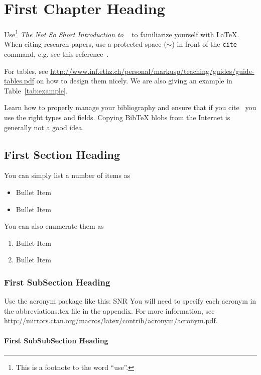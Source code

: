 \chapter{First Chapter Heading}

Use\footnote{This is a footnote to the word ``use''.}
\emph{The Not So Short Introduction to \LaTeXe}~\cite{Oetiker00}
to familiarize yourself with \LaTeX. When citing research papers, use a protected space ($\sim$) in front of the \texttt{cite} command, e.g. see this reference~\cite{inproceedings}.

For tables, see \url{http://www.inf.ethz.ch/personal/markusp/teaching/guides/guide-tables.pdf} on how to design them nicely. We are also giving an example in Table~\ref{tab:example}.

Learn how to properly manage your bibliography and ensure that if you cite~\cite{Achtzehn2015,ETSI2015,FCC,Fraga-Lamas2015} you use the right types and fields. Copying BibTeX blobs from the Internet is generally not a good idea.
\section{First Section Heading}

You can simply list a number of items as
\begin{itemize}
\item Bullet Item
\item Bullet Item
\end{itemize}

\noindent You can also enumerate them as
\begin{enumerate}
\item Bullet Item 
\item Bullet Item
\end{enumerate}
\subsection{First SubSection Heading}

Use the acronym package like this: \ac{SNR} %
You will need to specify each acronym in the abbreviations.tex file in the appendix. For more information, see \url{http://mirrors.ctan.org/macros/latex/contrib/acronym/acronym.pdf}.

\subsubsection{First SubSubSection Heading}

